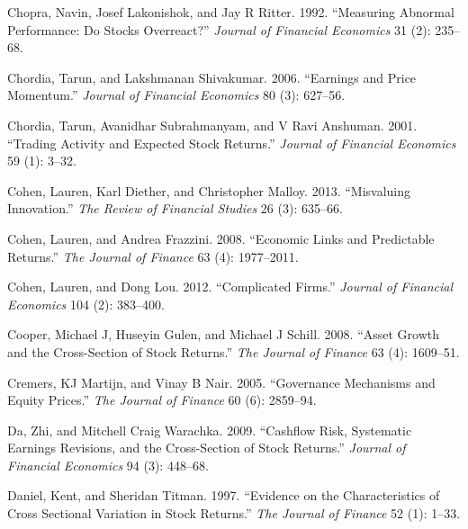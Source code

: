 \documentclass[
  letterpaper,
  DIV=11,
  numbers=noendperiod]{scrreprt}
\newlength{\cslhangindent}
\newlength{\cslentryspacingunit} %
\newenvironment{CSLReferences}[2] %
 {%
  \setlength{\parindent}{0pt}
  \ifodd #1
  \let\oldpar\par
  \def\par{\hangindent=\cslhangindent\oldpar}
  \fi
  \setlength{\parskip}{#2\cslentryspacingunit}
 }%
 {}
\begin{document}
\begin{CSLReferences}{1}{0}
\leavevmode{}%
Chopra, Navin, Josef Lakonishok, and Jay R Ritter. 1992. {``Measuring
Abnormal Performance: Do Stocks Overreact?''} \emph{Journal of Financial
Economics} 31 (2): 235--68.

\leavevmode{}%
Chordia, Tarun, and Lakshmanan Shivakumar. 2006. {``Earnings and Price
Momentum.''} \emph{Journal of Financial Economics} 80 (3): 627--56.

\leavevmode{}%
Chordia, Tarun, Avanidhar Subrahmanyam, and V Ravi Anshuman. 2001.
{``Trading Activity and Expected Stock Returns.''} \emph{Journal of
Financial Economics} 59 (1): 3--32.

\leavevmode{}%
Cohen, Lauren, Karl Diether, and Christopher Malloy. 2013. {``Misvaluing
Innovation.''} \emph{The Review of Financial Studies} 26 (3): 635--66.

\leavevmode{}%
Cohen, Lauren, and Andrea Frazzini. 2008. {``Economic Links and
Predictable Returns.''} \emph{The Journal of Finance} 63 (4):
1977--2011.

\leavevmode{}%
Cohen, Lauren, and Dong Lou. 2012. {``Complicated Firms.''}
\emph{Journal of Financial Economics} 104 (2): 383--400.

\leavevmode{}%
Cooper, Michael J, Huseyin Gulen, and Michael J Schill. 2008. {``Asset
Growth and the Cross-Section of Stock Returns.''} \emph{The Journal of
Finance} 63 (4): 1609--51.

\leavevmode{}%
Cremers, KJ Martijn, and Vinay B Nair. 2005. {``Governance Mechanisms
and Equity Prices.''} \emph{The Journal of Finance} 60 (6): 2859--94.

\leavevmode{}%
Da, Zhi, and Mitchell Craig Warachka. 2009. {``Cashflow Risk, Systematic
Earnings Revisions, and the Cross-Section of Stock Returns.''}
\emph{Journal of Financial Economics} 94 (3): 448--68.

\leavevmode{}%
Daniel, Kent, and Sheridan Titman. 1997. {``Evidence on the
Characteristics of Cross Sectional Variation in Stock Returns.''}
\emph{The Journal of Finance} 52 (1): 1--33.


\end{CSLReferences}
\end{document}

